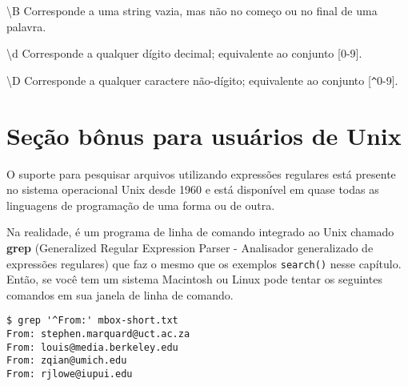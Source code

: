 {\textbackslash}B \newline
Corresponde a uma string vazia, mas não no começo ou no final de uma palavra.

{\textbackslash}d \newline
Corresponde a qualquer dígito decimal; equivalente ao conjunto [0-9].

{\textbackslash}D \newline
Corresponde a qualquer caractere não-dígito; equivalente ao conjunto [\verb"^"0-9].

\section{Seção bônus para usuários de Unix}

O suporte para pesquisar arquivos utilizando expressões regulares está presente no sistema 
operacional Unix desde 1960 e está disponível em quase todas as linguagens de programação de 
uma forma ou de outra.

Na realidade, é um programa de linha de comando integrado ao Unix chamado {\bf grep} 
(Generalized Regular Expression Parser - Analisador generalizado de expressões regulares)
que faz o mesmo que os exemplos {\tt search()} nesse capítulo. Então, se você tem um sistema
Macintosh ou Linux pode tentar os seguintes comandos em sua janela de linha de comando. 

\beforeverb
\begin{verbatim}
$ grep '^From:' mbox-short.txt
From: stephen.marquard@uct.ac.za
From: louis@media.berkeley.edu
From: zqian@umich.edu
From: rjlowe@iupui.edu
\end{verbatim}
\afterverb
%

